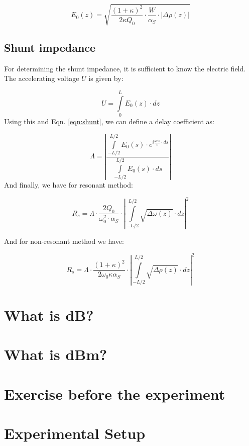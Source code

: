 \documentclass[a4paper]{article}
\numberwithin{equation}{section}
\begin{document}
\begin{equation} \label{eqn:E0_nonres}
		E_{0}(z) = \sqrt{\frac{(1 + \kappa)^2}{2 \kappa Q_{0}}\cdot \frac{W}{\alpha_{S}}\cdot \left| \Delta \rho(z) \right| }
\end{equation}

\subsection{Shunt impedance}
For determining the shunt impedance, it is sufficient to know the electric field. The accelerating voltage $U$ is given by: 

\[
		U = \int\limits_{0}^{L} E_{0}(z) \cdot dz
\]
Using this and Eqn. \ref{eqn:shunt}, we can define a delay coefficient as: 

\begin{equation}
		\Lambda = \left| \frac{\int\limits_{-L/2}^{L/2} E_{0}(s) \cdot e^{i \frac{\omega_{0}s}{c}\cdot ds}}{\int\limits_{-L/2}^{L/2} E_{0}(s) \cdot ds} \right| 
\end{equation}
And finally, we have for resonant method:

\begin{equation}
		R_{s} = \Lambda \cdot \frac{2Q_{0}}{\omega_{0}^2 \cdot \alpha_{S}} \cdot \left| \int\limits_{-L/2}^{L/2} \sqrt{\Delta \omega (z)} \cdot dz \right|^2
\end{equation}

And for non-resonant method we have: 

\begin{equation}
		R_{s} = \Lambda \cdot \frac{(1 + \kappa)^2}{2 \omega_{0} \kappa \alpha_{S}} \cdot \left| \int\limits_{-L/2}^{L/2} \sqrt{\Delta \rho (z)} \cdot dz \right|^2
\end{equation}

\section{What is dB?}

\section{What is dBm?}

\section{Exercise before the experiment}


\section{Experimental Setup}
\end{document}
